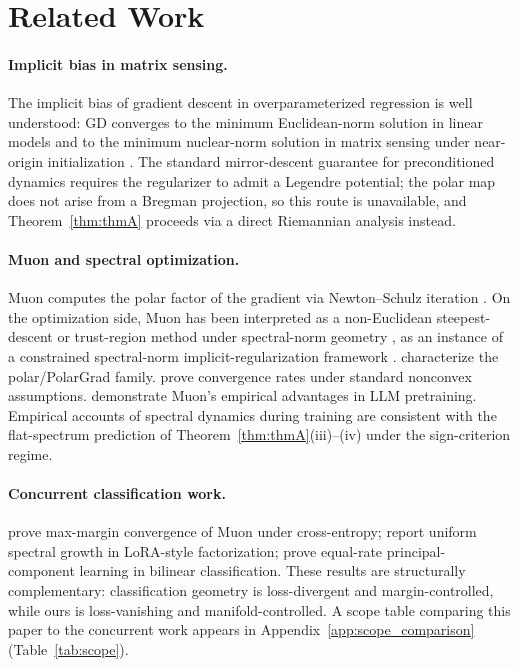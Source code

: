 \documentclass{article}
\begin{document}
\newpage

\section{Related Work}
\label{sec:related}

\paragraph{Implicit bias in matrix sensing.}
The implicit bias of gradient descent in overparameterized regression is well understood: GD converges to the minimum Euclidean-norm solution in linear models \citep{soudry2017bias,gunasekar2017implicit} and to the minimum nuclear-norm solution in matrix sensing under near-origin initialization \citep{gunasekar2017implicit,wu2021implicit}. The standard mirror-descent guarantee for preconditioned dynamics \citep{gunasekar2018implicitly} requires the regularizer to admit a Legendre potential; the polar map does not arise from a Bregman projection, so this route is unavailable, and Theorem~\ref{thm:thmA} proceeds via a direct Riemannian analysis instead.



\paragraph{Muon and spectral optimization.}
Muon \citep{jordan2024muon} computes the polar factor of the gradient via Newton--Schulz iteration \citep{bernstein2024spectral,tuddenham2022orthogonalising}. 
On the optimization side, Muon has been interpreted as a non-Euclidean steepest-descent or trust-region method under spectral-norm geometry \citep{lihong2025muon,kovalev2025trustregion}, as an instance of a constrained spectral-norm implicit-regularization framework \citep{chen2025spectralconstraint}. \citep{higham2008functions,amsel2025polar,lau2025polargrad,davis2025spectral} characterize the polar/PolarGrad family. \citep{shen2025convergence} prove convergence rates under standard nonconvex assumptions. \citep{liu2025moonlight} demonstrate Muon's empirical advantages in LLM pretraining. Empirical accounts of spectral dynamics during training \citep{yunis2024spectral,olsen2025spectra} are consistent with the flat-spectrum prediction of Theorem~\ref{thm:thmA}(iii)--(iv) under the sign-criterion regime. 


\paragraph{Concurrent classification work.}
\citep{fan2025muon,gronich2026muon} prove max-margin convergence of Muon under cross-entropy; \citep{kang2026muon} report uniform spectral growth in LoRA-style factorization; \citep{vasudeva2025imbalanced} prove equal-rate principal-component learning in bilinear classification. These results are structurally complementary: classification geometry is loss-divergent and margin-controlled, while ours is loss-vanishing and manifold-controlled. A scope table comparing this paper to the concurrent work appears in Appendix~\ref{app:scope_comparison} (Table~\ref{tab:scope}).
\end{document}
